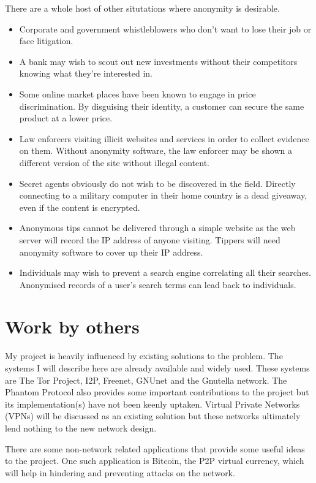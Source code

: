\documentclass[ %
                    author={Luke Murray},
                supervisor={Dr. Simon Hollis},
                     title={Shadow Peer-to-Peer Networks},
                  subtitle={},
                    degree={MEng},
                      year={2013} ]{thesis}
\begin{document}
There are a whole host of other situtations where anonymity is desirable.
\begin{itemize}
\item Corporate and government whistleblowers who don't want to lose their job or face litigation.
\item A bank may wish to scout out new investments without their competitors knowing what they're interested in.
\item Some online market places have been known to engage in price discrimination. By disguising their identity, a customer can secure the same product at a lower price.
\item Law enforcers visiting illicit websites and services in order to collect evidence on them. Without anonymity software, the law enforcer may be shown a different version of the site without illegal content.
\item Secret agents obviously do not wish to be discovered in the field. Directly connecting to a military computer in their home country is a dead giveaway, even if the content is encrypted.
\item Anonymous tips cannot be delivered through a simple website as the web server will record the IP address of anyone visiting. Tippers will need anonymity software to cover up their IP address.
\item Individuals may wish to prevent a search engine correlating all their searches. Anonymised records of a user's search terms can lead back to individuals\cite{Aol}.
\end{itemize}

\section{Work by others}

My project is heavily influenced by existing solutions to the problem. The systems I will describe here are already available and widely used. These systems are The Tor Project\cite{Tor}, I2P\cite{I2P}, Freenet\cite{Freenet}, GNUnet\cite{GNUnet} and the Gnutella network\cite{Gnutella}. The Phantom Protocol\cite{Phantom} also provides some important contributions to the project but its implementation(s) have not been keenly uptaken. Virtual Private Networks (VPNs) will be discussed as an existing solution but these networks ultimately lend nothing to the new network design. 

There are some non-network related applications that provide some useful ideas to the project. One such application is Bitcoin, the P2P virtual currency, which will help in hindering and preventing attacks on the network. 
\end{document}

